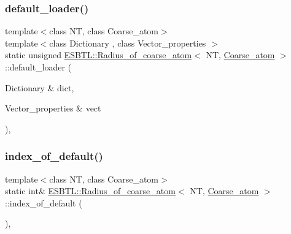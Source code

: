 \subsubsection{\texorpdfstring{default\+\_\+loader()}{default\_loader()}}
{\footnotesize\ttfamily template$<$class NT, class Coarse\+\_\+atom$>$ \\
template$<$class Dictionary , class Vector\+\_\+properties $>$ \\
static unsigned \hyperlink{classESBTL_1_1Radius__of__coarse__atom}{E\+S\+B\+T\+L\+::\+Radius\+\_\+of\+\_\+coarse\+\_\+atom}$<$ NT, \hyperlink{classESBTL_1_1Coarse__atom}{Coarse\+\_\+atom} $>$\+::default\+\_\+loader (\begin{DoxyParamCaption}\item[{Dictionary \&}]{dict,  }\item[{Vector\+\_\+properties \&}]{vect }\end{DoxyParamCaption})\hspace{0.3cm}{\ttfamily [inline]}, {\ttfamily [static]}}

\mbox{\label{classESBTL_1_1Radius__of__coarse__atom_a471c799507f450bc24c8a822514a7374}} 
\subsubsection{\texorpdfstring{index\+\_\+of\+\_\+default()}{index\_of\_default()}}
{\footnotesize\ttfamily template$<$class NT, class Coarse\+\_\+atom$>$ \\
static int\& \hyperlink{classESBTL_1_1Radius__of__coarse__atom}{E\+S\+B\+T\+L\+::\+Radius\+\_\+of\+\_\+coarse\+\_\+atom}$<$ NT, \hyperlink{classESBTL_1_1Coarse__atom}{Coarse\+\_\+atom} $>$\+::index\+\_\+of\+\_\+default (\begin{DoxyParamCaption}{ }\end{DoxyParamCaption})\hspace{0.3cm}{\ttfamily [inline]}, {\ttfamily [static]}}

\mbox{\label{classESBTL_1_1Radius__of__coarse__atom_ae5b17fa6eba26e4ee3e25e67adcfe08f}} 
